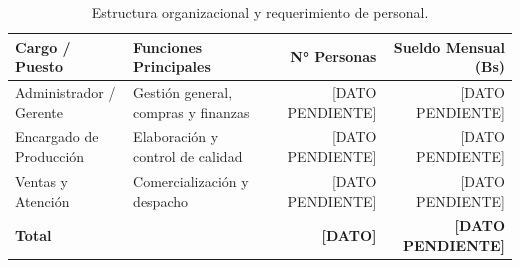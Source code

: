 \begin{table}[htbp]
    \centering
    \caption{Estructura organizacional y requerimiento de personal.}
    \label{tab:estructura_organizacional}
    \begin{tabularx}{\textwidth}{p{4.2cm}Xrr}
        \toprule
        \textbf{Cargo / Puesto} & \textbf{Funciones Principales} & \textbf{N° Personas} & \textbf{Sueldo Mensual (Bs)} \\
        \midrule
        Administrador / Gerente & Gestión general, compras y finanzas & [DATO PENDIENTE] & [DATO PENDIENTE] \\
        Encargado de Producción & Elaboración y control de calidad   & [DATO PENDIENTE] & [DATO PENDIENTE] \\
        Ventas y Atención       & Comercialización y despacho        & [DATO PENDIENTE] & [DATO PENDIENTE] \\
        \midrule
        \textbf{Total}          &                                    & \textbf{[DATO]}  & \textbf{[DATO PENDIENTE]} \\
        \bottomrule
    \end{tabularx}
\end{table}
